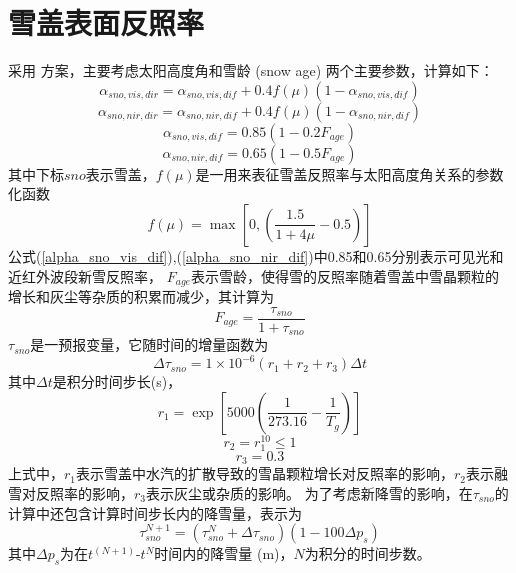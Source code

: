 \section{雪盖表面反照率}
采用 \citet{dickinson1986biosphere} 方案，主要考虑太阳高度角和雪龄 (snow age) 两个主要参数，计算如下：
\begin{equation}
\alpha_{sno, vis, dir}=\alpha_{sno, vis, dif}+0.4 f(\mu)\left(1-\alpha_{sno, vis, dif}\right)
\end{equation}
\begin{equation}
\alpha_{sno,nir,dir}=\alpha_{sno, nir, dif}+0.4 f(\mu)\left(1-\alpha_{sno,nir,dif}\right)
\end{equation}   
\begin{equation}\label{alpha_sno_vis_dif}
\alpha_{sno,vis,dif}=0.85\left(1-0.2 F_{age}\right)
\end{equation}
\begin{equation}\label{alpha_sno_nir_dif}
\alpha_{sno,nir,dif}=0.65\left(1-0.5 F_{age}\right)
\end{equation}
其中下标$sno$表示雪盖，$f(\mu)$是一用来表征雪盖反照率与太阳高度角关系的参数化函数
\begin{equation}\label{fmu}
f(\mu)=\max\left[0,\left(\frac{1.5}{1+4 \mu}-0.5\right)\right]
\end{equation}
公式(\ref{alpha_sno_vis_dif}),(\ref{alpha_sno_nir_dif})中0.85和0.65分别表示可见光和近红外波段新雪反照率，
$F_{age}$表示雪龄，使得雪的反照率随着雪盖中雪晶颗粒的增长和灰尘等杂质的积累而减少，其计算为
\begin{equation}
F_{a g e}=\frac{\tau_{sno}}{1+\tau_{sno}}
\end{equation}
$\tau_{sno}$是一预报变量，它随时间的增量函数为
\begin{equation}
\Delta \tau_{sno}=1 \times 10^{-6}\left(r_{1}+r_{2}+r_{3}\right) \Delta t
\end{equation}
其中$\Delta t$是积分时间步长(s)，
\begin{equation}
r_{1}=\exp \left[5000\left(\frac{1}{273.16}-\frac{1}{T_{g}}\right)\right]
\end{equation}
\begin{equation}
r_{2}=r_{1}^{10} \leq 1
\end{equation}
\begin{equation}
r_{3}=0.3
\end{equation}
上式中，$r_1$表示雪盖中水汽的扩散导致的雪晶颗粒增长对反照率的影响，$r_2$表示融雪对反照率的影响，$r_3$表示灰尘或杂质的影响。
为了考虑新降雪的影响，在$\tau_{sno}$的计算中还包含计算时间步长内的降雪量，表示为
\begin{equation}
\tau_{sno}^{N+1}=\left(\tau_{sno}^{N}+\Delta \tau_{sno}\right)\left(1-100 \Delta p_{s}\right)
\end{equation}
其中$\Delta p_{s}$为在$t^{(N+1)}$-$t^N$时间内的降雪量 (m)，$N$为积分的时间步数。



